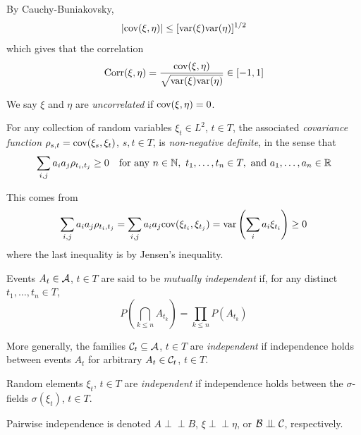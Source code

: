 By Cauchy-Buniakovsky,
\[ \abs{\tt{cov}(\xi, \eta)} \leq [\tt{var}(\xi)\tt{var}(\eta)]^{1/2} \]
which gives that the correlation
\[ \tt{Corr}(\xi, \eta) = \frac{\tt{cov}(\xi, \eta)}{\sqrt{\tt{var}(\xi)\tt{var}(\eta)}} \in [-1, 1] \]

\begin{definition}
    We say $\xi$ and $\eta$ are \emph{uncorrelated} if $\tt{cov}(\xi, \eta) = 0$.
\end{definition}

\begin{definition}
    For any collection of random variables $\xi_t \in L^2$, $t \in T$, the associated \emph{covariance function} $\rho_{s, t} = \tt{cov}(\xi_s, \xi_t)$, $s, t \in T$, is \emph{non-negative definite}, in the sense that
    \[ \sum_{i, j} a_ia_j\rho_{t_i, t_j} \geq 0 \quad \tt{for any } n \in \N,\ t_1, \ldots, t_n \in T, \tt{ and } a_1, \ldots, a_n \in \R \]
\end{definition}

This comes from
\[ \sum_{i, j} a_ia_j\rho_{t_i, t_j} = \sum_{i, j} a_ia_j\tt{cov}(\xi_{t_i}, \xi_{t_j}) = \tt{var}\left(\sum_{i} a_i\xi_{t_i}\right) \geq 0 \]
where the last inequality is by Jensen's inequality.

\begin{definition}
    Events $A_t \in \cal{A}$, $t \in T$ are said to be \emph{mutually independent} if, for any distinct $t_1, \ldots, t_n \in T$,
    \[ P\left(\bigcap_{k \leq n} A_{t_k}\right) = \prod_{k \leq n} P(A_{t_k}) \]
\end{definition}

\begin{definition}
    More generally, the families $\cal{C}_t \subseteq \cal{A}$, $t \in T$ are \emph{independent} if independence holds between events $A_t$ for arbitrary $A_t \in \cal{C}_t$, $t \in T$.
\end{definition}

\begin{definition}
    Random elements $\xi_t$, $t \in T$ are \emph{independent} if independence holds between the $\sigma$-fields $\sigma(\xi_t)$, $t \in T$.
\end{definition}

Pairwise independence is denoted $A \perp\!\!\!\perp B$, $\xi \perp\!\!\!\perp \eta$, or $\cal{B} \perp\!\!\!\perp \cal{C}$, respectively.

